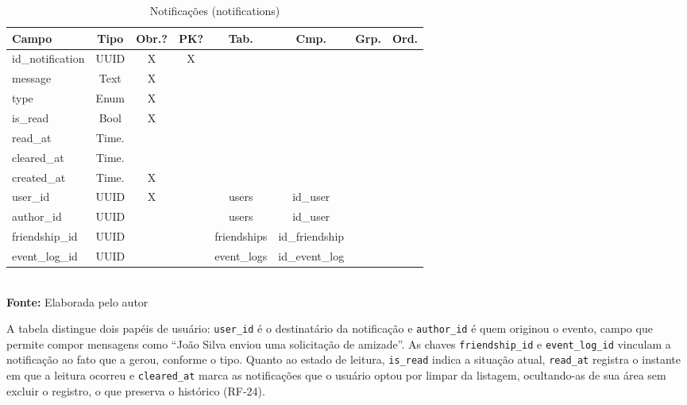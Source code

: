 \FloatBarrier
\begin{table}[!htbp]
\centering
\caption{Notificações (notifications)}
\footnotesize
\begin{tabularx}{\textwidth}{ | X | c | c | c | c | c | c | c | }
    \hline
    \textbf{Campo} & \textbf{Tipo} & \textbf{Obr.?} & \textbf{PK?} & \textbf{Tab.} & \textbf{Cmp.} & \textbf{Grp.} & \textbf{Ord.}\\ \hline
    id\_notification & UUID & X & X &  &  &  &  \\ \hline
    message & Text & X &  &  &  &  &  \\ \hline
    type & Enum & X &  &  &  &  &  \\ \hline
    is\_read & Bool & X &  &  &  &  &  \\ \hline
    read\_at & Time. &  &  &  &  &  &  \\ \hline
    cleared\_at & Time. &  &  &  &  &  &  \\ \hline
    created\_at & Time. & X &  &  &  &  &  \\ \hline
    user\_id & UUID & X &  & users & id\_user &  &  \\ \hline
    author\_id & UUID &  &  & users & id\_user &  &  \\ \hline
    friendship\_id & UUID &  &  & friendships & id\_friendship &  &  \\ \hline
    event\_log\_id & UUID &  &  & event\_logs & id\_event\_log &  &  \\ \hline
\end{tabularx}
\vspace{0.1cm} \\ \textbf{Fonte:} Elaborada pelo autor
\label{tab:tabelaNotificationDetalhado}
\end{table}

A tabela distingue dois papéis de usuário: \texttt{user\_id} é o destinatário da notificação e \texttt{author\_id} é quem originou o evento, campo que permite compor mensagens como ``João Silva enviou uma solicitação de amizade''. As chaves \texttt{friendship\_id} e \texttt{event\_log\_id} vinculam a notificação ao fato que a gerou, conforme o tipo. Quanto ao estado de leitura, \texttt{is\_read} indica a situação atual, \texttt{read\_at} registra o instante em que a leitura ocorreu e \texttt{cleared\_at} marca as notificações que o usuário optou por limpar da listagem, ocultando-as de sua área sem excluir o registro, o que preserva o histórico (RF-24).

